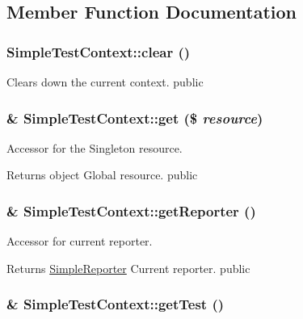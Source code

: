 \subsection{Member Function Documentation}
\hypertarget{class_simple_test_context_aeb3f91185b0b4e1895d4891d08b5af00}{
\subsubsection[{clear}]{\setlength{\rightskip}{0pt plus 5cm}SimpleTestContext::clear ()}}
\label{class_simple_test_context_aeb3f91185b0b4e1895d4891d08b5af00}
Clears down the current context.  public \hypertarget{class_simple_test_context_a8d245b59718e7818c6850b807643ccbc}{
\subsubsection[{get}]{\setlength{\rightskip}{0pt plus 5cm}\& SimpleTestContext::get (\$ {\em resource})}}
\label{class_simple_test_context_a8d245b59718e7818c6850b807643ccbc}
Accessor for the Singleton resource. \begin{DoxyReturn}{Returns}
object Global resource.  public 
\end{DoxyReturn}
\hypertarget{class_simple_test_context_a7d74e323221b6fa095929e46dc2811ac}{
\subsubsection[{getReporter}]{\setlength{\rightskip}{0pt plus 5cm}\& SimpleTestContext::getReporter ()}}
\label{class_simple_test_context_a7d74e323221b6fa095929e46dc2811ac}
Accessor for current reporter. \begin{DoxyReturn}{Returns}
\hyperlink{class_simple_reporter}{SimpleReporter} Current reporter.  public 
\end{DoxyReturn}
\hypertarget{class_simple_test_context_ae92c4b08904579ecde5d440b8e8023cf}{
\subsubsection[{getTest}]{\setlength{\rightskip}{0pt plus 5cm}\& SimpleTestContext::getTest ()}}
